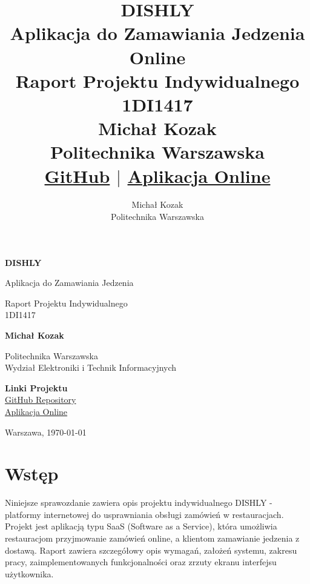 \documentclass[12pt,a4paper,utf-8]{article}
\title{%
    \textbf{DISHLY} \\
    \large Aplikacja do Zamawiania Jedzenia Online \\
    \large Raport Projektu Indywidualnego 1DI1417 \\
    \vspace{0.3cm}
    \normalsize Michał Kozak \\
    \small Politechnika Warszawska \\
    \vspace{0.5cm}
    \tiny \href{https://github.com/podlaskialgorytm3/dishly}{GitHub} $|$ \href{https://dishly-ochre.vercel.app/}{Aplikacja Online}
}
\author{Michał Kozak \\ Politechnika Warszawska}
\date{}
\begin{document}
\begin{titlepage}
    \centering
    \vspace*{2cm}
    
    {\LARGE \textbf{DISHLY}}
    
    \vspace{0.5cm}
    
    {\large Aplikacja do Zamawiania Jedzenia}
    
    \vspace{2cm}
    
    {\Large Raport Projektu Indywidualnego} \\
    {\normalsize 1DI1417}
    
    \vspace{3cm}
    
    {\Large \textbf{Michał Kozak}}
    
    \vspace{2cm}
    
    {\large Politechnika Warszawska} \\
    {\normalsize Wydział Elektroniki i Technik Informacyjnych}
    
    \vspace{3cm}
    
    {\normalsize \textbf{Linki Projektu}} \\
    \href{https://github.com/podlaskialgorytm3/dishly}{GitHub Repository} \\
    \href{https://dishly-ochre.vercel.app/}{Aplikacja Online}
    
    \vfill
    
    {\normalsize Warszawa, \today}
    
\end{titlepage}

\cleardoublepage

\tableofcontents
\newpage

\section{Wstęp}

Niniejsze sprawozdanie zawiera opis projektu indywidualnego DISHLY - platformy internetowej do usprawniania obsługi zamówień w restauracjach. Projekt jest aplikacją typu SaaS (Software as a Service), która umożliwia restauracjom przyjmowanie zamówień online, a klientom zamawianie jedzenia z dostawą. Raport zawiera szczegółowy opis wymagań, założeń systemu, zakresu pracy, zaimplementowanych funkcjonalności oraz zrzuty ekranu interfejsu użytkownika.
\end{document}
